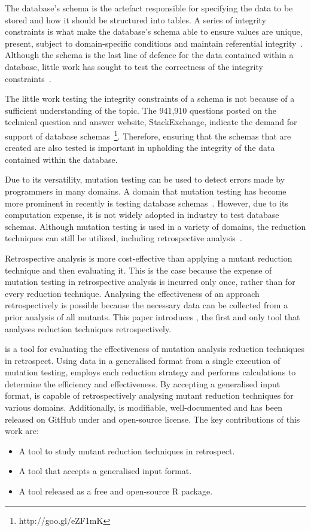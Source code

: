 The database's schema is the artefact responsible for specifying the data to be stored and
how it should be structured into tables. A series of integrity constraints
is what make the database's schema able to ensure values are unique, present,
subject to domain-specific conditions and maintain referential integrity~\cite{mcminn2016virtual}.
Although the schema is the last line of defence for the data contained
within a database, little work has sought to test the correctness of the integrity constraints~\cite{mcminn2015effectiveness}.




The little work testing the integrity constraints of a schema is not
because of a sufficient understanding of the topic. The 941,910 questions posted on
the technical question and answer website, StackExchange, indicate the demand for support
of database schemas~\footnote{http://goo.gl/eZF1mK}. Therefore, ensuring that
the schemas that are created are also tested is important in upholding the integrity
of the data contained within the database.

Due to its versatility, mutation testing can be used to detect errors made by programmers in many domains.
A domain that mutation testing has become more prominent in recently is testing database
schemas~\cite{mcminn2016virtual, mcminn2015effectiveness, wright2013efficient}. However,
due to its computation expense, it is not widely adopted in industry to test database schemas.
Although mutation testing is used in a variety of domains, the reduction techniques can still
be utilized, including retrospective analysis~\cite{jia2011analysis, wong1995reducing, offutt1993experimental, offutt2001mutation}.

Retrospective analysis is more cost-effective than applying a
mutant reduction technique and then evaluating it.
This is the case because the expense of mutation testing in
retrospective analysis is incurred only once, rather than for
every reduction technique. Analysing the effectiveness of an approach retrospectively
is possible because the necessary data can be collected from a prior analysis of all mutants.
This paper introduces \mr, the first and only tool that analyses reduction techniques retrospectively.

\mr is a tool for evaluating the effectiveness of mutation analysis reduction techniques
in retrospect. Using data in a generalised format from a single execution of mutation testing, \mr
employs each reduction strategy and performs calculations to determine the efficiency and
effectiveness. By accepting a generalised input format, \mr is capable of
retrospectively analysing mutant reduction techniques for various domains.
Additionally, \mr is modifiable, well-documented and has been released on
GitHub under and open-source license. The key contributions of this work are:

    \begin{itemize}
        \item A tool to study mutant reduction techniques in retrospect.
        \item A tool that accepts a generalised input format.
        \item A tool released as a free and open-source R package.
    \end{itemize}
